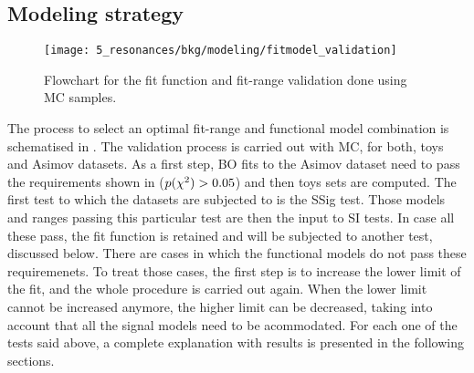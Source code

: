 















\subsection{Modeling strategy}
\label{subsec:bkg:modeling:strategy}


\begin{figure}[ht!]
    \centering
    \texttt{[image: 5\_resonances/bkg/modeling/fitmodel\_validation]}
    \caption{Flowchart for the fit function and fit-range validation done using \ac{MC} samples.}
    \label{fig:bkg:modeling:strategy:fitmodel_validation}
\end{figure}

The process to select an optimal fit-range and functional model combination is schematised in \Fig{\ref{fig:bkg:modeling:strategy:fitmodel_validation}}.
The validation process is carried out with \ac{MC}, for both, toys and Asimov datasets. As a first step, \ac{BO} fits to the Asimov dataset need to pass the requirements shown in \Fig{\ref{fig:bkg:modeling:preparation:datasets_generation}} (\(p(\chi^{2}) > 0.05\)) and then toys sets are computed. The first test to which the datasets are subjected to is the \acf{SSig} test. Those models and ranges passing this particular test are then the input to \ac{SI} tests. In case all these pass, the fit function is retained and will be subjected to another test, discussed below. There are cases in which the functional models do not pass these requiremenets. To treat those cases, the first step is to increase the lower limit of the fit, and the whole procedure is carried out again. When the lower limit cannot be increased anymore, the higher limit can be decreased, taking into account that all the signal models need to be acommodated. For each one of the tests said above, a complete explanation with results is presented in the following sections.

